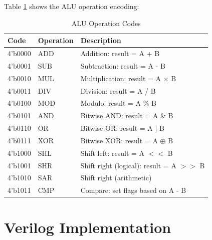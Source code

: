 \documentclass[12pt,a4paper,oneside]{book}
\begin{document}
Table \ref{tab:alu-ops} shows the ALU operation encoding:

\begin{table}[H]
\centering
\caption{ALU Operation Codes}
\label{tab:alu-ops}
\begin{tabularx}{\textwidth}{|l|l|X|}
\hline
\textbf{Code} & \textbf{Operation} & \textbf{Description} \\
\hline
4'b0000 & ADD & Addition: result = A + B \\
4'b0001 & SUB & Subtraction: result = A - B \\
4'b0010 & MUL & Multiplication: result = A $\times$ B \\
4'b0011 & DIV & Division: result = A / B \\
4'b0100 & MOD & Modulo: result = A \% B \\
4'b0101 & AND & Bitwise AND: result = A \& B \\
4'b0110 & OR & Bitwise OR: result = A | B \\
4'b0111 & XOR & Bitwise XOR: result = A $\oplus$ B \\
4'b1000 & SHL & Shift left: result = A $<<$ B \\
4'b1001 & SHR & Shift right (logical): result = A $>>$ B \\
4'b1010 & SAR & Shift right (arithmetic) \\
4'b1011 & CMP & Compare: set flags based on A - B \\
\hline
\end{tabularx}
\end{table}

\section{Verilog Implementation}
\end{document}
